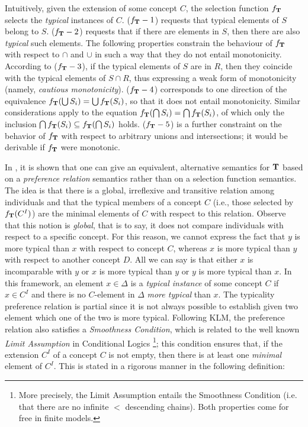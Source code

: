 \documentclass[a4paper, 11pt, oneside]{duthesis}
\newcommand{\tip}{{\bf T}}
\newcommand{\incluso} {\subseteq}
\begin{document}
\noindent Intuitively, given the extension of some concept $C$, the selection function $f_\tip$ selects  the {\em typical} instances of $C$.
($f_\tip-1$) requests that typical elements of $S$ belong to $S$.
($f_\tip-2$) requests that if there are elements in $S$, then there are also {\em typical} such elements.
The following properties constrain the behaviour of $f_\tip$ with respect to $\cap$ and $\cup$ in such a way that they do not entail monotonicity.
According to ($f_\tip-3$), if the typical elements of $S$ are in $R$, then they coincide with the typical elements of $S \cap R$, thus expressing a weak form of monotonicity (namely, {\em cautious monotonicity}).
($f_\tip-4$) corresponds to one direction of the equivalence $f_\tip(\bigcup S_i) = \bigcup f_\tip(S_i)$, so that it does not entail monotonicity.
Similar considerations apply to the equation $f_\tip(\bigcap S_i) = \bigcap f_\tip(S_i)$, of which only the inclusion $\bigcap f_\tip(S_i) \incluso f_\tip(\bigcap S_i)$ holds. ($f_\tip-5$) is a further constraint on the behavior of $f_\tip$ with respect to arbitrary unions and intersections; it would be derivable if $f_\tip$ were monotonic.

In \cite{FI09}, it is shown that one can give an equivalent, alternative semantics for $\tip$ based on a \emph{preference relation} semantics rather than on a selection function semantics.
The idea is that there is a global, irreflexive and transitive relation among individuals and that the typical members of a concept $C$ (i.e., those selected by $f_\tip(C^I)$) are the minimal elements of $C$ with respect to this relation.
Observe that this notion is \emph{global}, that is to say, it does not compare individuals with respect to a specific concept.
For this reason,  we cannot express the fact that $y$ is more typical than $x$ with respect to concept $C$, whereas $x$ is more typical than $y$ with respect to another concept $D$.
All we can say is that either $x$ is incomparable with $y$ or $x$ is more typical than $y$ or $y$ is more typical than $x$.
In this framework, an element $x \in \Delta$ is a {\em typical instance} of some concept $C$ if $x \in C^I$ and there is no $C$-element in $\Delta$ {\em more typical} than $x$.
The typicality preference relation is partial since it is not always possible to establish given two element which one of the two is more typical.
Following KLM, the preference relation also satisfies a \emph{Smoothness Condition}, which is related to the well known \emph{Limit Assumption} in Conditional Logics \cite{Nute80}
\footnote{More precisely, the Limit Assumption entails the Smoothness Condition (i.e. that there are no infinite $<$ descending chains). Both properties come for free in finite models.};
this condition ensures that, if the extension $C^I$ of a concept $C$ is not empty, then there is at least one \emph{minimal} element of $C^I$.
This is stated in a rigorous manner in the following definition:
\end{document}
